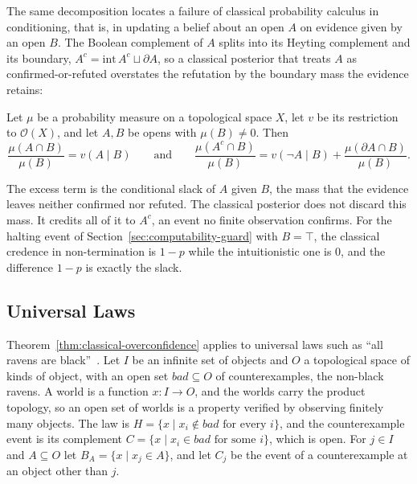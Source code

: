 The same decomposition locates a failure of classical probability calculus
in conditioning, that is, in updating a belief about an open $A$ on
evidence given by an open $B$. The Boolean complement of $A$ splits into its
Heyting complement and its boundary,
$A^{c} = \mathrm{int}\,A^{c} \sqcup \partial A$, so a classical
posterior that treats $A$ as confirmed-or-refuted overstates the
refutation by the boundary mass the evidence retains:

\begin{theorem}
\label{thm:classical-overconfidence}
Let $\mu$ be a probability measure on a topological space $X$, let
$v$ be its restriction to $\mathcal{O}(X)$, and let $A, B$ be opens
with $\mu(B) \neq 0$. Then
\[
  \frac{\mu(A \cap B)}{\mu(B)} = v(A \mid B)
  \qquad\text{and}\qquad
  \frac{\mu(A^{c} \cap B)}{\mu(B)}
  = v(\neg A \mid B) + \frac{\mu(\partial A \cap B)}{\mu(B)}.
\]
\end{theorem}

\noindent
The excess term is the conditional slack of $A$ given $B$, the mass
that the evidence leaves neither confirmed nor refuted. The classical
posterior does not discard this mass. It credits all of it to $A^{c}$,
an event no finite observation confirms. For the halting event of
Section~\ref{sec:computability-guard} with $B = \top$, the classical
credence in non-termination is $1 - p$ while the intuitionistic one is
$0$, and the difference $1 - p$ is exactly the slack.

\subsection{Universal Laws}
\label{sec:ravens}

Theorem~\ref{thm:classical-overconfidence} applies to universal laws such
as ``all ravens are black''~\cite{hempel1945}. Let $I$ be an infinite set
of objects and $O$ a topological space of kinds of object, with an open
set $\mathit{bad} \subseteq O$ of counterexamples, the non-black ravens. A
world is a function $x : I \to O$, and the worlds carry the product
topology, so an open set of worlds is a property verified by observing
finitely many objects. The law is
$H = \{x \mid x_i \notin \mathit{bad} \text{ for every } i\}$, and the
counterexample event is its complement
$C = \{x \mid x_i \in \mathit{bad} \text{ for some } i\}$, which is open.
For $j \in I$ and $A \subseteq O$ let $B_A = \{x \mid x_j \in A\}$, and
let $C_j$ be the event of a counterexample at an object other than $j$.

